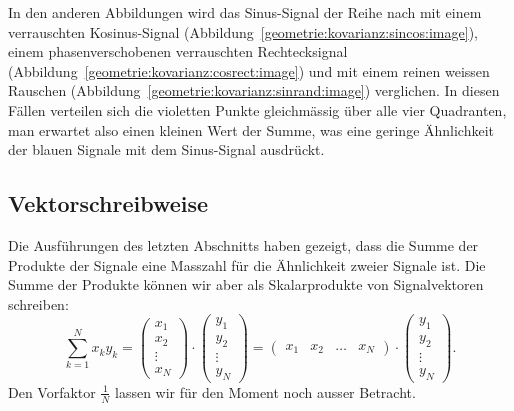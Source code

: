 In den anderen Abbildungen
wird das Sinus-Signal der Reihe nach mit einem verrauschten
Kosinus-Signal (Abbildung~\ref{geometrie:kovarianz:sincos:image}),
einem phasenverschobenen verrauschten Rechtecksignal
(Abbildung~\ref{geometrie:kovarianz:cosrect:image})
und mit einem reinen weissen Rauschen
(Abbildung~\ref{geometrie:kovarianz:sinrand:image})
verglichen.
In diesen Fällen verteilen sich die violetten Punkte gleichmässig
über alle vier Quadranten, man erwartet also einen kleinen Wert
der Summe, was eine geringe Ähnlichkeit der blauen Signale mit dem
Sinus-Signal ausdrückt.


\subsection{Vektorschreibweise}
Die Ausführungen des letzten Abschnitts haben gezeigt, dass die Summe der
Produkte der Signale eine Masszahl für die Ähnlichkeit zweier Signale ist.
Die Summe der Produkte können wir aber als Skalarprodukte von Signalvektoren
schreiben:
\[
\sum_{k=1}^N x_ky_k
=
\begin{pmatrix}x_1\\x_2\\\vdots\\x_N\end{pmatrix}
\cdot
\begin{pmatrix}y_1\\y_2\\\vdots\\y_N\end{pmatrix}
=
\begin{pmatrix}x_1&x_2&\dots&x_N\end{pmatrix}
\cdot
\begin{pmatrix}y_1\\y_2\\\vdots\\y_N\end{pmatrix}.
\]
Den Vorfaktor $\frac1{N}$ lassen wir für den Moment noch ausser Betracht.

